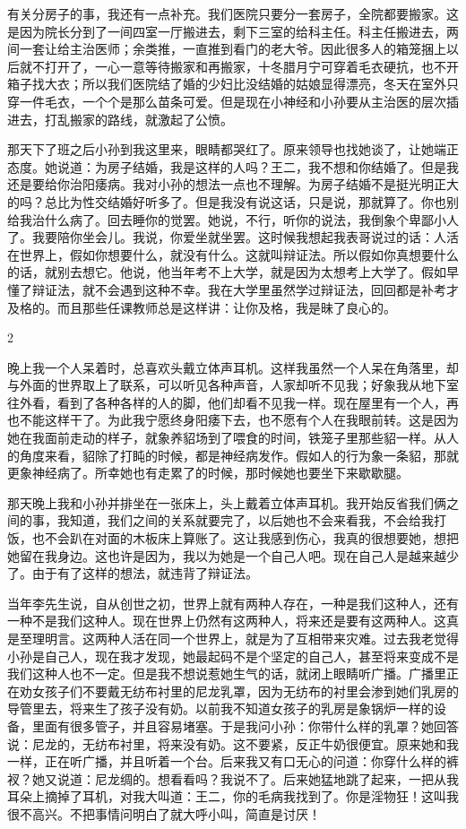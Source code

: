 有关分房子的事，我还有一点补充。我们医院只要分一套房子，全院都要搬家。这是因为院长分到了一间四室一厅搬进去，剩下三室的给科主任。科主任搬进去，两间一套让给主治医师；余类推，一直推到看门的老大爷。因此很多人的箱笼捆上以后就不打开了，一心一意等待搬家和再搬家，十冬腊月宁可穿着毛衣硬抗，也不开箱子找大衣；所以我们医院结了婚的少妇比没结婚的姑娘显得漂亮，冬天在室外只穿一件毛衣，一个个是那么苗条可爱。但是现在小神经和小孙要从主治医的层次插进去，打乱搬家的路线，就激起了公愤。 

那天下了班之后小孙到我这里来，眼睛都哭红了。原来领导也找她谈了，让她端正态度。她说道：为房子结婚，我是这样的人吗？王二，我不想和你结婚了。但是我还是要给你治阳痿病。我对小孙的想法一点也不理解。为房子结婚不是挺光明正大的吗？总比为性交结婚好听多了。但是我没有说这话，只是说，那就算了。你也别给我治什么病了。回去睡你的觉罢。她说，不行，听你的说法，我倒象个卑鄙小人了。我要陪你坐会儿。我说，你爱坐就坐罢。这时候我想起我表哥说过的话：人活在世界上，假如你想要什么，就没有什么。这就叫辩证法。所以假如你真想要什么的话，就别去想它。他说，他当年考不上大学，就是因为太想考上大学了。假如早懂了辩证法，就不会遇到这种不幸。我在大学里虽然学过辩证法，回回都是补考才及格的。而且那些任课教师总是这样讲：让你及格，我是昧了良心的。 

2 

晚上我一个人呆着时，总喜欢头戴立体声耳机。这样我虽然一个人呆在角落里，却与外面的世界取上了联系，可以听见各种声音，人家却听不见我；好象我从地下室往外看，看到了各种各样的人的脚，他们却看不见我一样。现在屋里有一个人，再也不能这样干了。为此我宁愿终身阳痿下去，也不愿有个人在我眼前转。这是因为她在我面前走动的样子，就象养貂场到了喂食的时间，铁笼子里那些貂一样。从人的角度来看，貂除了打盹的时候，都是神经病发作。假如人的行为象一条貂，那就更象神经病了。所幸她也有走累了的时候，那时候她也要坐下来歇歇腿。 

那天晚上我和小孙并排坐在一张床上，头上戴着立体声耳机。我开始反省我们俩之间的事，我知道，我们之间的关系就要完了，以后她也不会来看我，不会给我打饭，也不会趴在对面的木板床上算账了。这让我感到伤心，我真的很想要她，想把她留在我身边。这也许是因为，我以为她是一个自己人吧。现在自己人是越来越少了。由于有了这样的想法，就违背了辩证法。 

当年李先生说，自从创世之初，世界上就有两种人存在，一种是我们这种人，还有一种不是我们这种人。现在世界上仍然有这两种人，将来还是要有这两种人。这真是至理明言。这两种人活在同一个世界上，就是为了互相带来灾难。过去我老觉得小孙是自己人，现在我才发现，她最起码不是个坚定的自己人，甚至将来变成不是我们这种人也不一定。但是我不想说惹她生气的话，就闭上眼睛听广播。广播里正在劝女孩子们不要戴无纺布衬里的尼龙乳罩，因为无纺布的衬里会渗到她们乳房的导管里去，将来生了孩子没有奶。以前我不知道女孩子的乳房是象锅炉一样的设备，里面有很多管子，并且容易堵塞。于是我问小孙：你带什么样的乳罩？她回答说：尼龙的，无纺布衬里，将来没有奶。这不要紧，反正牛奶很便宜。原来她和我一样，正在听广播，并且听着一个台。后来我又有口无心的问道：你穿什么样的裤衩？她又说道：尼龙绸的。想看看吗？我说不了。后来她猛地跳了起来，一把从我耳朵上摘掉了耳机，对我大叫道：王二，你的毛病我找到了。你是淫物狂！这叫我很不高兴。不把事情问明白了就大呼小叫，简直是讨厌！ 

